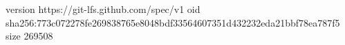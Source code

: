 version https://git-lfs.github.com/spec/v1
oid sha256:773c072278fe269838765e8048bdf33564607351d432232eda21bbf78ea787f5
size 269508
